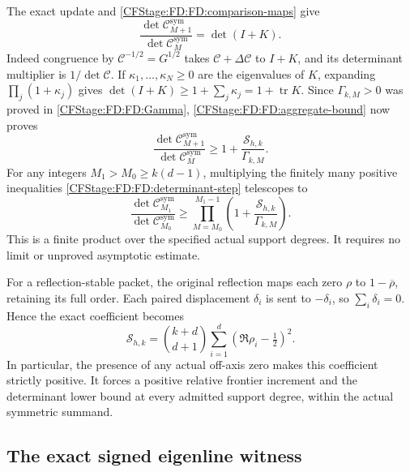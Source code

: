 The exact update and \eqref{CFStage:FD:FD:comparison-maps} give
\begin{equation}
\frac{\det\mathcal C_{M+1}^{\mathrm{sym}}}
{\det\mathcal C_M^{\mathrm{sym}}}=\det(I+K).
\tag{FD.37}\label{CFStage:FD:FD:determinant-identity}
\end{equation}
Indeed congruence by \(\mathcal C^{-1/2}=G^{1/2}\) takes
\(\mathcal C+\Delta\mathcal C\) to \(I+K\), and its determinant
multiplier is \(1/\det\mathcal C\).  If
\(\kappa_1,\ldots,\kappa_N\ge0\) are the eigenvalues of \(K\),
expanding \(\prod_j(1+\kappa_j)\) gives
\(\det(I+K)\ge1+\sum_j\kappa_j=1+\operatorname{tr}K\).
Since \(\Gamma_{k,M}>0\) was proved in \eqref{CFStage:FD:FD:Gamma},
\eqref{CFStage:FD:FD:aggregate-bound} now proves
\begin{equation}
\boxed{\frac{\det\mathcal C_{M+1}^{\mathrm{sym}}}
{\det\mathcal C_M^{\mathrm{sym}}}
\ge1+\frac{\mathcal S_{h,k}}{\Gamma_{k,M}}.}
\tag{FD.38}\label{CFStage:FD:FD:determinant-step}
\end{equation}
For any integers \(M_1>M_0\ge k(d-1)\), multiplying the finitely many
positive inequalities \eqref{CFStage:FD:FD:determinant-step} telescopes to
\begin{equation}
\boxed{\frac{\det\mathcal C_{M_1}^{\mathrm{sym}}}
{\det\mathcal C_{M_0}^{\mathrm{sym}}}
\ge\prod_{M=M_0}^{M_1-1}
\left(1+\frac{\mathcal S_{h,k}}{\Gamma_{k,M}}\right).}
\tag{FD.39}\label{CFStage:FD:FD:determinant-product}
\end{equation}
This is a finite product over the specified actual support degrees.
It requires no limit or unproved asymptotic estimate.

For a reflection-stable packet, the original reflection maps each zero
\(\rho\) to \(1-\overline\rho\), retaining its full order.  Each
paired displacement \(\delta_i\) is sent to \(-\delta_i\), so
\(\sum_i\delta_i=0\).  Hence the exact coefficient becomes
\begin{equation}
\boxed{\mathcal S_{h,k}=\binom{k+d}{d+1}
\sum_{i=1}^d(\Re\rho_i-\tfrac12)^2.}
\tag{FD.40}\label{CFStage:FD:FD:reflection-coefficient}
\end{equation}
In particular, the presence of any actual off-axis zero makes this
coefficient strictly positive.  It forces a positive relative frontier
increment and the determinant lower bound at every admitted support
degree, within the actual symmetric summand.

\subsection{The exact signed eigenline witness}

